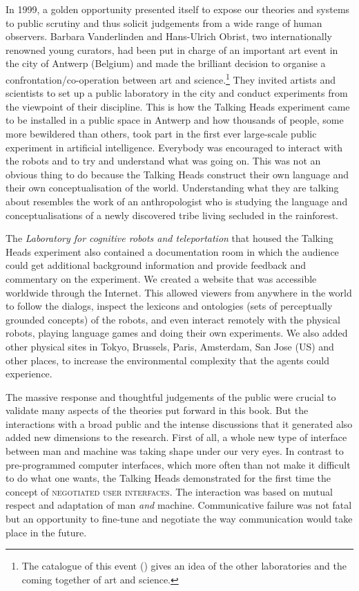 In 1999, a golden opportunity presented itself to 
expose our theories and systems to public scrutiny and thus solicit
judgements from a wide range of human observers. Barbara
Vanderlinden and Hans-Ulrich Obrist, two internationally 
renowned young curators, had been put in charge of 
an important art event in the city of Antwerp (Belgium)
and made the brilliant decision to organise a 
confrontation/co-operation between art and 
science.\footnote{The catalogue of this event (\citealt{Obrist:1999}) gives an idea of 
the other laboratories and the coming together of art and science.}
They invited 
artists and scientists to set up 
a public laboratory in the city and conduct experiments 
from the viewpoint of their discipline. This is how 
the Talking Heads experiment came to be installed in 
a public space in Antwerp and how thousands of people, 
some more bewildered than others, took part in the first
ever large-scale public experiment in artificial intelligence. 
Everybody was encouraged to interact with the robots and 
to try and understand what was going on. This was not an obvious
thing to do because the Talking Heads
construct their own language and their own conceptualisation of 
the world. Understanding what they are talking about resembles the work 
of an anthropologist who is studying the language and
conceptualisations of a newly discovered tribe living
secluded in the rainforest. 

The {\itshape Laboratory for cognitive robots and 
teleportation} that housed the 
Talking Heads experiment also contained  
a documentation room in which the audience could 
get additional background information and 
provide feedback and commentary 
on the experiment. We created a website that was accessible 
worldwide through the Internet. This allowed viewers from anywhere
in the world to follow the dialogs, inspect the lexicons
and ontologies (sets of perceptually grounded concepts) 
of the robots, and even interact remotely with the 
physical robots, playing language games 
and doing their own experiments. We also added
other physical sites in Tokyo, Brussels, Paris, Amsterdam, 
San Jose (US) and other places, to increase the environmental complexity that 
the agents could experience. 

\enlargethispage{1\baselineskip}
The massive response and thoughtful judgements of the 
public were crucial to validate many aspects of the 
theories put forward in this book. 
But the interactions with a broad public and
the intense discussions that it generated also added new
dimensions to the research. First of all, a whole 
new type of interface between man and machine was
taking shape under our very eyes. In contrast to pre-programmed
computer interfaces, which more often than not make it
difficult to do what one wants, the Talking Heads demonstrated
for the first time the concept of {\scshape negotiated user
interfaces}. The interaction was based on mutual respect
and adaptation of man {\itshape and} machine. Communicative
failure was not fatal but 
an opportunity to fine-tune and negotiate the way communication
would take place in the future. 

